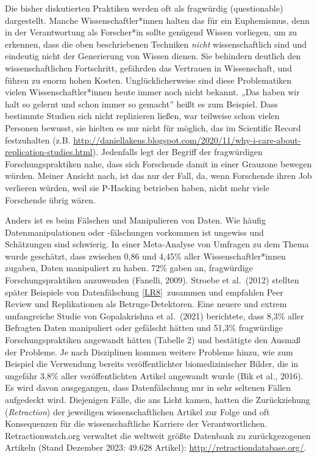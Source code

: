\documentclass[
  letterpaper,
  DIV=11,
  numbers=noendperiod]{scrreprt}
\begin{document}
Die bisher diskutierten Praktiken werden oft als fragwürdig
(questionable) dargestellt. Manche Wissenschaftler*innen halten das für
ein Euphemismus, denn in der Verantwortung als Forscher*in sollte
genügend Wissen vorliegen, um zu erkennen, dass die oben beschriebenen
Techniken \emph{nicht} wissenschaftlich sind und eindeutig nicht der
Generierung von Wissen dienen. Sie behindern deutlich den
wissenschaftlichen Fortschritt, gefährden das Vertrauen in Wissenschaft,
und führen zu enorm hohen Kosten. Unglücklicherweise sind diese
Problematiken vielen Wissenschaftler*innen heute immer noch nicht
bekannt. „Das haben wir halt so gelernt und schon immer so gemacht''
heißt es zum Beispiel. Dass bestimmte Studien sich nicht replizieren
ließen, war teilweise schon vielen Personen bewusst, sie hielten es nur
nicht für möglich, das im Scientific Record festzuhalten (z.B.
\url{http://daniellakens.blogspot.com/2020/11/why-i-care-about-replication-studies.html}).
Jedenfalls legt der Begriff der fragwürdigen Forschungspraktiken nahe,
dass sich Forschende damit in einer Grauzone bewegen würden. Meiner
Ansicht nach, ist das nur der Fall, da, wenn Forschende ihren Job
verlieren würden, weil sie P-Hacking betrieben haben, nicht mehr viele
Forschende übrig wären.

Anders ist es beim Fälschen und Manipulieren von Daten. Wie häufig
Datenmanipulationen oder -fälschungen vorkommen ist ungewiss und
Schätzungen sind schwierig. In einer Meta-Analyse von Umfragen zu dem
Thema wurde geschätzt, dass zwischen 0,86 und 4,45\% aller
Wissenschaftler*innen zugaben, Daten manipuliert zu haben. 72\% gaben
an, fragwürdige Forschungspraktiken anzuwenden (Fanelli, 2009). Stroebe
et al.~(2012) stellten später Beispiele von Datenfälschung
\hyperref[_msocom_8]{{[}LR8{]}}~zusammen und empfahlen Peer Review und
Replikationen als Betrugs-Detektoren. Eine neuere und extrem
umfangreiche Studie von Gopalakrishna et al.~(2021) berichtete, dass
8,3\% aller Befragten Daten manipuliert oder gefälscht hätten und 51,3\%
fragwürdige Forschungspraktiken angewandt hätten (Tabelle 2) und
bestätigte den Ausmaß der Probleme. Je nach Disziplinen kommen weitere
Probleme hinzu, wie zum Beispiel die Verwendung bereits veröffentlichter
biomedizinischer Bilder, die in ungefähr 3,8\% aller veröffentlichten
Artikel angewandt wurde (Bik et al., 2016). Es wird davon ausgegangen,
dass Datenfälschung nur in sehr seltenen Fällen aufgedeckt wird.
Diejenigen Fälle, die ans Licht kamen, hatten die Zurückziehung
(\emph{Retraction}) der jeweiligen wissenschaftlichen Artikel zur Folge
und oft Konsequenzen für die wissenschaftliche Karriere der
Verantwortlichen. Retractionwatch.org verwaltet die weltweit größte
Datenbank zu zurückgezogenen Artikeln (Stand Dezember 2023: 49.628
Artikel): \url{http://retractiondatabase.org/}.
\end{document}
